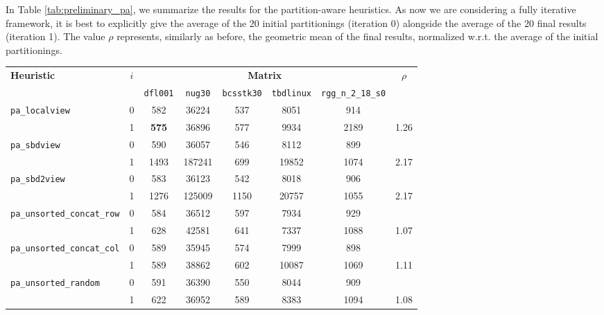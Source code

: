 In Table \ref{tab:preliminary_pa}, we summarize the results for the partition-aware heuristics. As now we are considering a fully iterative framework, it is best to explicitly give the average of the 20 initial partitionings (iteration 0) alongside the average of the 20 final results (iteration 1). The value $\rho$ represents, similarly as before, the geometric mean of the final results, normalized w.r.t. the average of the initial partitionings. 

\begin{table}[h]
	\centering
	\renewcommand{\arraystretch}{1.15}
	\begin{tabular}{|l|c||c|c|c|c|c||c|}
		\hline
		\multirow{2}{*}{\textbf{Heuristic}} & \multirow{2}{*}{$i$} &  \multicolumn{5}{|c||}{\textbf{Matrix}} & \multirow{2}{*}{$\rho$} \\ \cline{3-7}
		& & \texttt{dfl001} & \texttt{nug30} & \texttt{bcsstk30} & \texttt{tbdlinux} & \texttt{rgg\_n\_2\_18\_s0} & \\ \hline
		\verb|pa_localview| & 0 & 582 & 36224 & 537 & 8051 & 914 &   \\ %
		& 1 & \textbf{575} & 36896 & 577 & 9934 & 2189 & 1.26 \\ \hline %

		\verb|pa_sbdview| & 0 & 590 & 36057 & 546 & 8112 & 899 & \\ %
		& 1 & 1493 & 187241 & 699 & 19852 & 1074 & 2.17 \\ \hline %

		\verb|pa_sbd2view| & 0 & 583 &  36123 & 542 & 8018 & 906 &  \\ %
		& 1 & 1276 & 125009 & 1150 & 20757 & 1055 & 2.17 \\ \hline %
		
		\verb|pa_unsorted_concat_row| & 0 & 584 & 36512 & 597 & 7934 & 929 & \\ %
		& 1 & 628 & 42581 & 641 & 7337 & 1088 & 1.07 \\\hline %
		
		\verb|pa_unsorted_concat_col| & 0 & 589 & 35945 & 574 & 7999 & 898 & \\ %
		& 1 & 589 & 38862 & 602 & 10087 & 1069 & 1.11 \\\hline %
		
		\verb|pa_unsorted_random| & 0 & 591 & 36390 & 550 & 8044 & 909 & \\ %
		& 1 & 622 & 36952 & 589 & 8383 & 1094 & 1.08 \\ \hline %
		

\end{tabular}
\end{table}
